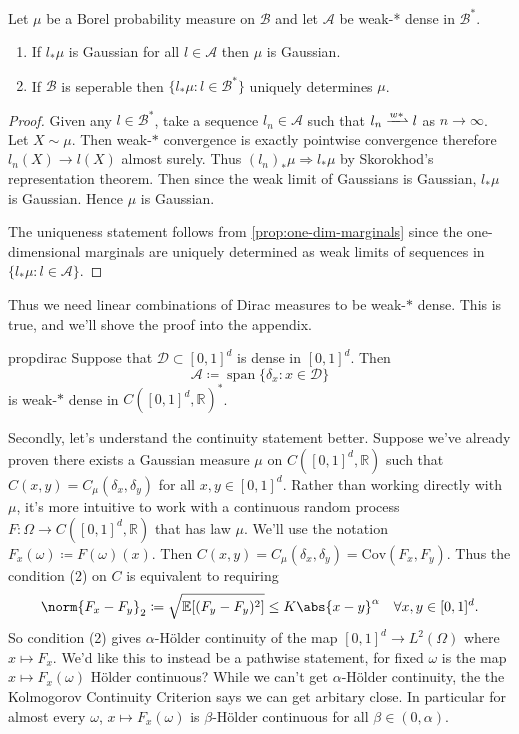 \documentclass[fontsize=12pt, DIV=10]{scrreprt}
\theoremstyle{remark}
\newcommand{\defeq}{\coloneqq}
\newcommand{\R}{\mathbb R}
\newcommand{\E}{\mathbb E}
\newcommand{\calA}{\mathcal A}
\newcommand{\calB}{\mathcal B}
\newcommand{\calD}{\mathcal D}
\newcommand{\towk}{\Rightarrow}
\DeclareMathOperator{\spn}{span}
\newcommand{\unitbox}{\ensuremath{[0,1]^d}}
\begin{document}
\begin{prop}
	\label{prop:weak-star-suff}
	Let $\mu$ be a Borel probability measure on $\calB$ and let $\calA$ be weak-* dense in $\calB^*$. 
	\begin{enumerate}
		\item If $l_* \mu$ is Gaussian for all $l \in \calA$ then $\mu$ is Gaussian.
		\item If $\calB$ is seperable then $\{l_* \mu : l \in \calB^*\}$ uniquely determines $\mu$.
	\end{enumerate}
\end{prop}
\begin{proof}
	Given any $l \in \calB^*$, take a sequence $l_n \in \calA$ such that $l_n \xrightharpoonup{w*} l$ as $n \to \infty$. Let $X \sim \mu$. Then weak-$*$ convergence is exactly pointwise convergence therefore $l_n(X) \to l(X)$ almost surely. Thus $(l_n)_* \mu \towk l_* \mu$ by Skorokhod's representation theorem. Then since the weak limit of Gaussians is Gaussian, $l_* \mu$ is Gaussian. Hence $\mu$ is Gaussian.

	The uniqueness statement follows from \vref{prop:one-dim-marginals} since the one-dimensional marginals are uniquely determined as weak limits of sequences in $\{l_* \mu : l \in \calA\}$.
\end{proof}

Thus we need linear combinations of Dirac measures to be weak-$*$ dense. This is true, and we'll shove the proof into the appendix.
\begin{restatable}{prop}{dirac}
	\label{prop:dirac-density}
	Suppose that $\calD \subset \unitbox$ is dense in $\unitbox$. Then 
	\begin{equation}
		\calA \defeq \spn\{\delta_x : x \in \calD\}
	\end{equation}
	is weak-$*$ dense in $C(\unitbox, \R)^*$.
\end{restatable}

Secondly, let's understand the continuity statement better. Suppose we've already proven there exists a Gaussian measure $\mu$ on $C([0, 1]^d, \R)$ such that $C(x, y) = C_{\mu}(\delta_x, \delta_y)$ for all $x, y \in [0, 1]^d$. Rather than working directly with $\mu$, it's more intuitive to work with a continuous random process $F: \Omega \to C([0, 1]^d, \R)$ that has law $\mu$. We'll use the notation $F_x(\omega) \defeq F(\omega)(x)$. Then $C(x, y) = C_{\mu}(\delta_x, \delta_y) = \text{Cov}(F_x, F_y)$. Thus the condition (2) on $C$ is equivalent to requiring
\begin{equation}
	\norm{F_x - F_y}_2 \defeq \sqrt{\E[(F_y - F_y)^2]} \leq K \abs{x - y}^{\alpha} \quad \forall x, y \in [0, 1]^d.
\end{equation}
So condition (2) gives $\alpha$-H\"older continuity of the map $[0, 1]^d \to L^2(\Omega)$ where $x \mapsto F_x$. We'd like this to instead be a pathwise statement, for fixed $\omega$ is the map $x \mapsto F_x(\omega)$ H\"older continuous? While we can't get $\alpha$-H\"older continuity, the the Kolmogorov Continuity Criterion says we can get arbitary close. In particular for almost every $\omega$, $x \mapsto F_x(\omega)$ is $\beta$-H\"older continuous for all $\beta \in (0, \alpha)$.
\end{document}
